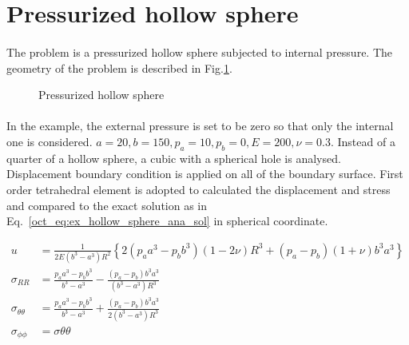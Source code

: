 \section{Pressurized hollow sphere}
\paragraph{}
The problem is a pressurized hollow sphere subjected to internal pressure.
The geometry of the problem is described in Fig.\ref{oct_fig:ex_pre-hollow-sphere}. 

\begin{figure}[h!]
  \centering
  \caption{Pressurized hollow sphere}
  \label{oct_fig:ex_pre-hollow-sphere}
\end{figure}

\paragraph{}
In the example, the external pressure is set to be zero so that only the internal one is considered. $a=20, b=150, p_a = 10,p_b = 0, E=200,\nu=0.3$.
Instead of a quarter of a hollow sphere, a cubic with a spherical hole is analysed.
Displacement boundary condition is applied on all of the boundary surface.
First order tetrahedral element is adopted to calculated the displacement and stress and compared to the exact solution as in Eq.~\ref{oct_eq:ex_hollow_sphere_ana_sol} in spherical coordinate.

\begin{subequations}
\begin{align}
  u & = \frac{1}{2E(b^3-a^3)R^2}\left\{ 2(p_aa^3-p_bb^3)(1-2\nu)R^3+(p_a-p_b)(1+\nu)b^3a^3\right\}\\
  \sigma_{RR} & = \frac{p_aa^3-p_bb^3}{b^3-a^3} - \frac{(p_a-p_b)b^3a^3}{(b^3-a^3)R^3}\\
  \sigma_{\theta\theta} & = \frac{p_aa^3-p_bb^3}{b^3-a^3} + \frac{(p_a-p_b)b^3a^3}{2(b^3-a^3)R^3}\\
  \sigma_{\phi\phi} & = \sigma{\theta\theta}
  \label{oct_eq:ex_hollow_sphere_ana_sol}
\end{align}
\end{subequations}


